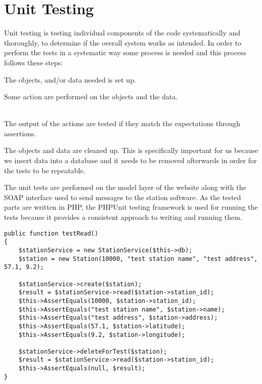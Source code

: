 \section{Unit Testing}
Unit testing is testing individual components of the code systematically and thoroughly, to determine if the overall system works as intended.
In order to perform the tests in a systematic way some process is needed and this process follows these steps:

\begin{description}[style=nextline]
\item[Set Up] The objects, and/or data needed is set up.
\item[Action] Some action are performed on the objects and the data.
\item[Test] \hfill \\ 
The output of the actions are tested if they match the expectations through assertions.
\item[Tear Down/Clean Up] The objects and data are cleaned up. This is specifically important for us because we insert data into a database and it needs to be removed afterwards in order for the tests to be repeatable.
\end{description}

The unit tests are performed on the model layer of the website along with the SOAP interface used to send messages to the station software.
As the tested parts are written in PHP, the PHPUnit testing framework is used for running the tests because it provides a consistent approach to writing and running them.

\begin{lstlisting}[caption = {Example of a unit test.}, label = {lst:unitTestExample}]
public function testRead()
{
	$stationService = new StationService($this->db);
	$station = new Station(10000, "test station name", "test address", 57.1, 9.2);

	$stationService->create($station);
	$result = $stationService->read($station->station_id);
	$this->AssertEquals(10000, $station->station_id);
	$this->AssertEquals("test station name", $station->name);
	$this->AssertEquals("test address", $station->address);
	$this->AssertEquals(57.1, $station->latitude);
	$this->AssertEquals(9.2, $station->longitude);

	$stationService->deleteForTest($station);
	$result = $stationService->read($station->station_id);
	$this->AssertEquals(null, $result);
}
\end{lstlisting}

